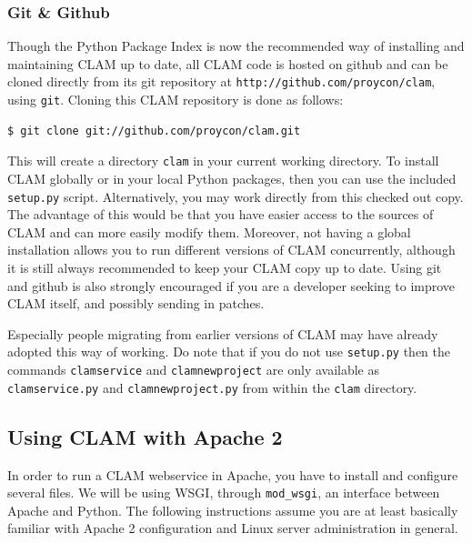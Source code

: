 \documentclass[a4paper,12pt]{report}
\begin{document}
\subsubsection{Git \& Github}

Though the Python Package Index is now the recommended way of installing and
maintaining CLAM up to date, all CLAM code is hosted on github and can be
cloned directly from its git repository at
\texttt{http://github.com/proycon/clam}, using \texttt{git}. Cloning this CLAM
repository is done as follows:

\begin{verbatim}
$ git clone git://github.com/proycon/clam.git
\end{verbatim}
 
This will create a directory \texttt{clam} in your current working directory.
To install CLAM globally or in your local Python packages, then you can use the
included \texttt{setup.py} script. Alternatively, you may work directly from
this checked out copy. The advantage of this would be that you have easier
access to the sources of CLAM and can more easily modify them. Moreover, not
having a global installation allows you to run different versions of CLAM
concurrently, although it is still always recommended to keep your CLAM copy up
to date. Using git and github is also strongly encouraged if you are a
developer seeking to improve CLAM itself, and possibly sending in patches.

Especially people migrating from earlier versions of CLAM may have already
adopted this way of working. Do note that if you do not use \texttt{setup.py}
then the commands \texttt{clamservice} and \texttt{clamnewproject} are only
available as \texttt{clamservice.py} and \texttt{clamnewproject.py} from within
the \texttt{clam} directory. 

\subsection{Using CLAM with Apache 2}

In order to run a CLAM webservice in Apache, you have to install and configure
several files. We will be using WSGI, through \texttt{mod\_wsgi}, an interface
between Apache and Python. The following instructions assume you are at least
basically familiar with Apache 2 configuration and Linux server administration
in general.
\end{document}
